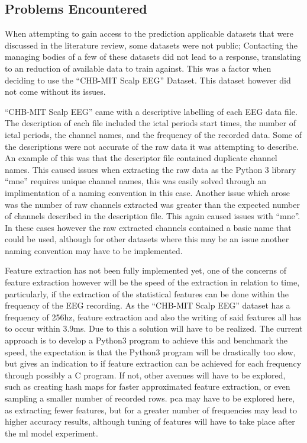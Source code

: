 \documentclass[12pt]{article}
\begin{document}



\subsection{Problems Encountered}

When attempting to gain access to the prediction applicable datasets that were discussed in the literature review, some datasets were not public; Contacting the managing bodies of a few of these datasets did not lead to a response, translating to an reduction of available data to train against. This was a factor when deciding to use the ``CHB-MIT Scalp EEG'' Dataset. This dataset however did not come without its issues.

``CHB-MIT Scalp EEG'' came with a descriptive labelling of each EEG data file. The description of each file included the ictal periods start times, the number of ictal periods, the channel names, and the frequency of the recorded data. Some of the descriptions were not accurate of the raw data it was attempting to describe. An example of this was that the descriptor file contained duplicate channel names. This caused issues when extracting the raw data as the Python 3 library ``mne'' requires unique channel names,  this was easily solved through an implimentation of a naming convention in this case. Another issue which arose was the number of raw channels extracted was greater than the expected number of channels described in the description file. This again caused issues with ``mne''. In these cases however the raw extracted channels contained a basic name that could be used, although for other datasets where this may be an issue another naming convention may have to be implemented. 

Feature extraction has not been fully implemented yet, one of the concerns of feature extraction however will be the speed of the extraction in relation to time, particularly, if the extraction of the statistical features can be done within the frequency of the EEG recording. As the ``CHB-MIT Scalp EEG'' dataset has a frequency of 256hz, feature extraction and also the writing of said features all has to occur within 3.9ms. Due to this a solution will have to be realized. The current approach is to develop a Python3 program to achieve this and benchmark the speed, the expectation is that the Python3 program will be drastically too slow, but gives an indication to if feature extraction can be achieved for each frequency through possibly a C program. If not, other avenues will have to be explored, such as creating hash maps for faster approximated feature extraction, or even sampling a smaller number of recorded rows. \acrfull{pca} may have to be explored here, as extracting fewer features, but for a greater number of frequencies may lead to higher accuracy results, although tuning of features will have to take place after the \acrshort{ml} model experiment.
\end{document}
